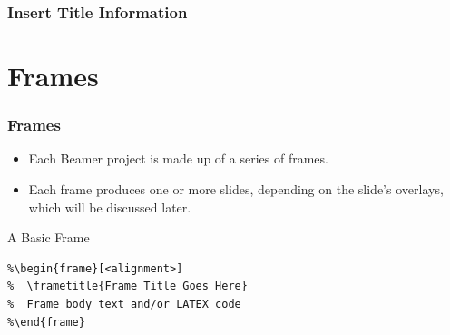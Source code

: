 \documentclass[aspectratio=169,utf8]{ctexbeamer}
\begin{document}
\begin{frame}
  \frametitle{Insert Title Information}

    
\end{frame}


\section{Frames}

\begin{frame}[fragile]
  \frametitle{Frames}

  \begin{itemize}
    \setlength{\itemsep}{8pt}
    \item Each Beamer project is made up of a series of frames.
    \item Each frame produces one or more slides, depending on the slide's overlays, which will be discussed later.
  \end{itemize}

  \begin{block}{A Basic Frame}
    \begin{verbatim}
%\begin{frame}[<alignment>]
%  \frametitle{Frame Title Goes Here}
%  Frame body text and/or LATEX code
%\end{frame}
    \end{verbatim}
  \end{block}
  
\end{frame}
\end{document}
